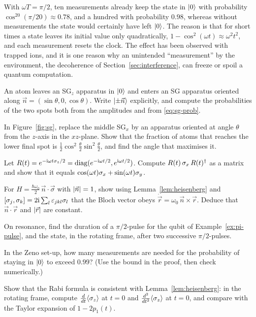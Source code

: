 With $\omega T=\pi/2$, ten measurements already keep the state in $\left|0\right\rangle$ with probability $\cos^{20}(\pi/20)\approx0.78$, and a hundred with probability $0.98$, whereas without measurements the state would certainly have left $\left|0\right\rangle$. The reason is that for short times a state leaves its initial value only quadratically, $1-\cos^2(\omega t)\approx\omega^2t^2$, and each measurement resets the clock. The effect has been observed with trapped ions, and it is one reason why an unintended ``measurement'' by the environment, the decoherence of Section~\ref{sec:interference}, can freeze or spoil a quantum computation.

\begin{exerciseset}
   An atom leaves an SG$_z$ apparatus in $\left|0\right\rangle$ and enters an SG apparatus oriented along $\vec n=(\sin\theta,0,\cos\theta)$. Write $\left|\pm\vec n\right\rangle$ explicitly, and compute the probabilities of the two spots both from the amplitudes and from \eqref{eq:sg-prob}.

   In Figure~\ref{fig:sg}, replace the middle SG$_x$ by an apparatus oriented at angle $\theta$ from the $z$-axis in the $xz$-plane. Show that the fraction of atoms that reaches the lower final spot is $\tfrac12\cos^2\tfrac\theta2\sin^2\tfrac\theta2$, and find the angle that maximises it.

  \label{ex:rotate-x} Let $R(t)=e^{-\mathrm{i}\omega t\sigma_z/2}=\operatorname{diag}(e^{-\mathrm{i}\omega t/2},e^{\mathrm{i}\omega t/2})$. Compute $R(t)\,\sigma_x\,R(t)^\dagger$ as a matrix and show that it equals $\cos(\omega t)\sigma_x+\sin(\omega t)\sigma_y$.

  \label{ex:precess-n} For $H=\tfrac{\hbar\omega_0}2\,\vec n\cdot\vec\sigma$ with $\left|\vec n\right|=1$, show using Lemma~\ref{lem:heisenberg} and $\left[\sigma_j,\sigma_k\right]=2\mathrm{i}\sum_l\varepsilon_{jkl}\sigma_l$ that the Bloch vector obeys $\dot{\vec r}=\omega_0\,\vec n\times\vec r$. Deduce that $\vec n\cdot\vec r$ and $\left|\vec r\right|$ are constant.

   On resonance, find the duration of a $\pi/2$-pulse for the qubit of Example~\ref{ex:pi-pulse}, and the state, in the rotating frame, after two successive $\pi/2$-pulses.

   In the Zeno set-up, how many measurements are needed for the probability of staying in $\left|0\right\rangle$ to exceed $0.99$? (Use the bound in the proof, then check numerically.)

   Show that the Rabi formula is consistent with Lemma~\ref{lem:heisenberg}: in the rotating frame, compute $\tfrac{d}{dt}\langle\sigma_z\rangle$ at $t=0$ and $\tfrac{d^2}{dt^2}\langle\sigma_z\rangle$ at $t=0$, and compare with the Taylor expansion of $1-2p_1(t)$.
\end{exerciseset}

